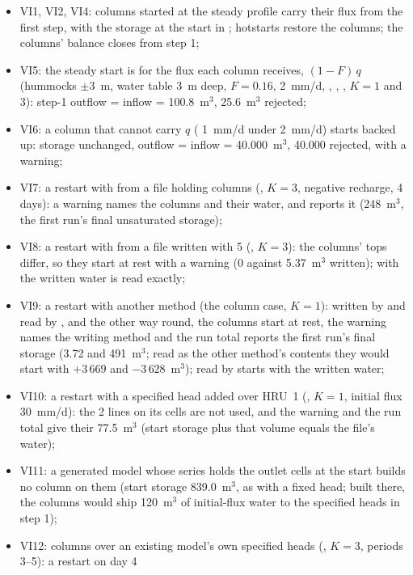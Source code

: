\begin{itemize}
\item VI1, VI2, VI4: columns started at the steady profile carry their flux from the first step, with the storage at the start
in ; hotstarts restore the columns; the columns' balance closes from step 1;
\item VI5: the steady start is for the flux each column receives, $(1-F)\,q$ (hummocks $\pm3$~m, water table 3~m deep,
$F=0.16$, 2~mm/d, , , , $K=1$ and 3): step-1 outflow = inflow = 100.8~m$^3$, 25.6~m$^3$
rejected;
\item VI6: a column that cannot carry $q$ ( 1~mm/d under 2~mm/d) starts backed up: storage unchanged, outflow =
inflow = 40.000~m$^3$, 40.000 rejected, with a warning;
\item VI7: a restart with  from a file holding columns (, $K=3$, negative recharge, 4 days):
a warning names the columns and their water, and  reports it (248~m$^3$, the first run's final
unsaturated storage);
\item VI8: a restart with  from a file written with 5 (, $K=3$): the columns' tops differ,
so they start at rest with a warning (0 against 5.37~m$^3$ written); with  the written water is read exactly;
\item VI9: a restart with another method (the column case, $K=1$): written by  and read by , and
the other way round, the columns start at rest, the warning names the writing method and the run total reports the
first run's final storage (3.72 and 491~m$^3$; read as the other method's contents they would start with $+3\,669$ and
$-3\,628$~m$^3$);  read by  starts with the written water;
\item VI10: a restart with a specified head added over HRU~1 (, $K=1$, initial flux 30~mm/d): the 2 lines on its
cells are not used, and the warning and the run total give their 77.5~m$^3$ (start storage plus that volume equals the
file's water);
\item VI11: a generated model whose  series holds the outlet cells at the start builds no column on them
(start storage 839.0~m$^3$, as with a fixed head; built there, the columns would ship 120~m$^3$ of initial-flux water to
the specified heads in step 1);
\item VI12: columns over an existing model's own specified heads (, $K=3$, periods 3--5): a restart on day 4

\end{itemize}
